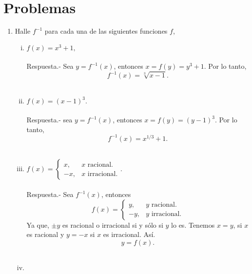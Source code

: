 \section{Problemas}
\begin{enumerate}[\bfseries 1.]

    \item Halle $f^{-1}$ para cada una de las siguientes funciones $f$,

	\begin{enumerate}[(i)]

	    \item $f(x)=x^3+1,$\\\\
		Respuesta.-\;  Sea $y=f^{-1}(x)$, entonces $x=f(y)=y^3+1$. Por lo tanto,
		$$f^{-1}(x)=\sqrt[3]{x-1}.$$\\

	    \item $f(x)=(x-1)^3$.\\\\
		Respuesta.-\; sea $y=f^{-1}(x)$, entonces $x=f(y)=(y-1)^3$. Por lo tanto,
		$$f^{-1}(x)=x^{1/3}+1.$$\\

	    \item $f(x)=\left\{\begin{array}{rl} x,&x\mbox{ racional.}\\ -x,& x\mbox{ irracional}.\end{array}\right.$.\\\\ 
		Respuesta.-\; Sea $f^{-1}(x)$, entonces
		$$f(x)=\left\{\begin{array}{rl} y,&y\mbox{ racional.}\\ -y,& y\mbox{ irracional}.\end{array}\right.$$
		Ya que, $\pm y$ es racional o irracional si y sólo si $y$ lo es. Tenemos $x=y$, si $x$ es racional y $y=-x$ si $x$ es irracional. Así.
		$$y=f(x).$$\\

	    \item 


	\end{enumerate}

\end{enumerate}



